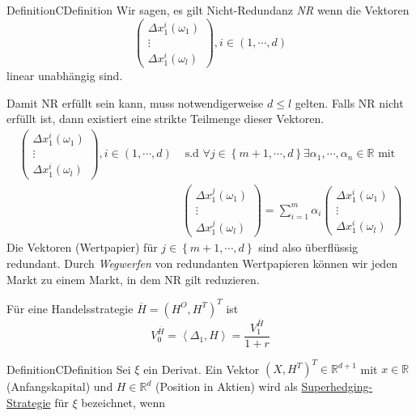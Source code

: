 \documentclass[11.5 pt, a4paper]{memoir}
\begin{document}
\begin{ibox}[3.5]{Definition}{CDefinition}
    Wir sagen, es gilt Nicht-Redundanz \textit{NR} wenn die Vektoren 
		$$ \begin{pmatrix}
			\Delta x_1^{i} (\omega_1) \\
			\vdots \\
			\Delta x_1^{i} (\omega_l) 
		\end{pmatrix}
	, i \in \left( 1 , \cdots,  d \right) 	 $$
linear unabhängig sind.		
\end{ibox}
Damit NR erfüllt sein kann, muss notwendigerweise $ d \leq l $ gelten. Falls NR nicht erfüllt ist, dann existiert
eine strikte  Teilmenge dieser Vektoren. 
		\begin{align*}
		\begin{pmatrix}
			\Delta x_1^{i} (\omega_1) \\
			\vdots \\
			\Delta x_1^{i} (\omega_l) 
		\end{pmatrix}
	, i \in \left( 1 , \cdots,  d \right) &\text{ s.d } \forall j \in \left\{ m +1 , \cdots,  d \right\} \exists 
	\alpha_1 , \cdots,  \alpha_n \in \mathbb{R} \text{ mit } \\	
	&\begin{pmatrix}
			\Delta x_1^{j} (\omega_1) \\
			\vdots \\
			\Delta x_1^{j} (\omega_l) 
		\end{pmatrix} = \sum_{i = 1}^{m} \alpha_i  \begin{pmatrix}
			\Delta x_1^{i} (\omega_1) \\
			\vdots \\
			\Delta x_1^{i} (\omega_l) 
		\end{pmatrix}
		\end{align*}
Die Vektoren (Wertpapier) für $ j \in \left\{ m +1 , \cdots,  d \right\}  $ sind also überflüssig redundant. Durch 
\textit{Wegwerfen} von redundanten Wertpapieren können wir jeden Markt zu einem Markt, in dem NR gilt reduzieren.

Für eine Handelsstrategie $ \overline{ H} = \left( H^{O}, H^{T} \right)^{T}  $ ist 
$$ V_{0}^{ \overline{ H} } = \left< \Delta_1, H \right> = \frac{V_1^{ \overline{ H} }}{1 +r }  $$

\begin{ibox}[3.9]{Definition}{CDefinition}
    Sei $ \xi $ ein Derivat. Ein Vektor $ \left( X, H^{T} \right) ^{T} \in \mathbb{R}^{d+1} $ mit $  x \in \mathbb{R}$
		(Anfangskapital) und $ H \in \mathbb{R}^{d}  $ (Position in Aktien) wird als \underline{Superhedging-Strategie} 
		für $ \xi $ bezeichnet, wenn 

\end{ibox}
\end{document}
